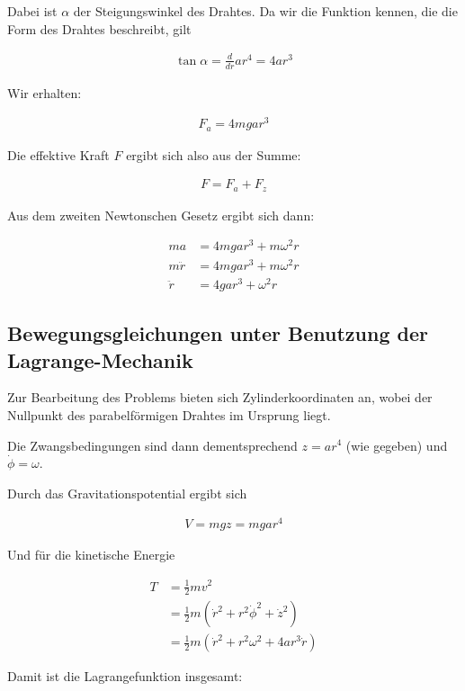 \documentclass[a4paper,german,12pt,smallheadings]{scrartcl}
\begin{document}
Dabei ist $\alpha$ der Steigungswinkel des Drahtes. Da wir die Funktion kennen,
die die Form des Drahtes beschreibt, gilt

\begin{align*}
  \tan \alpha = \frac{d}{dr} ar^4 = 4ar^3
\end{align*}

Wir erhalten:

\begin{align*}
  F_a = 4mgar^3
\end{align*}

Die effektive Kraft $F$ ergibt sich also aus der Summe:

\begin{align*}
  F = F_a + F_z
\end{align*}

Aus dem zweiten Newtonschen Gesetz ergibt sich dann:

\begin{align*}
  ma &= 4mgar^3 + m \omega^2 r \\
  m\ddot{r} &= 4mgar^3 + m \omega^2 r \\
  \ddot{r} &= 4gar^3 + \omega^2 r
\end{align*}

\subsection*{Bewegungsgleichungen unter Benutzung der Lagrange-Mechanik}

Zur Bearbeitung des Problems bieten sich Zylinderkoordinaten an, wobei der
Nullpunkt des parabelförmigen Drahtes im Ursprung liegt.

Die Zwangsbedingungen sind dann dementsprechend $z=ar^4$ (wie gegeben) und
$\dot{\phi} = \omega$.

Durch das Gravitationspotential ergibt sich

\begin{align*}
  V = mgz = mgar^4
\end{align*}

Und für die kinetische Energie

\begin{align*}
  T &= \frac{1}{2}mv^2 \\
    &= \frac{1}{2}m(\dot{r}^2 + r^2\dot{\phi}^2 + \dot{z}^2) \\
    &= \frac{1}{2}m(\dot{r}^2 + r^2\omega^2 + 4ar^3\dot{r})
\end{align*}

Damit ist die Lagrangefunktion insgesamt:
\end{document}
